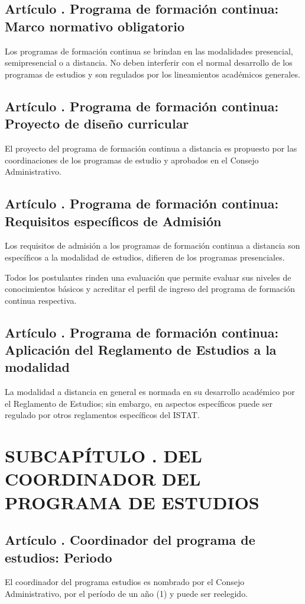 \subsection{Artículo . Programa de formación continua: Marco normativo obligatorio}
\addtocounter{ns}{1}
Los programas de formación continua se brindan en las modalidades presencial, semipresencial o a distancia. No deben interferir con el normal desarrollo de los programas de estudios y son regulados por los lineamientos académicos generales. 
\subsection{Artículo . Programa de formación continua: Proyecto de diseño curricular}
\addtocounter{ns}{1}
El proyecto del programa de formación continua a distancia es propuesto por las coordinaciones de los programas de estudio y aprobados en el Consejo Administrativo. 
\subsection{Artículo . Programa de formación continua: Requisitos específicos de Admisión}
\addtocounter{ns}{1}
Los requisitos de admisión a los programas de formación continua a distancia son específicos a la modalidad de estudios, difieren de los programas presenciales.  

Todos los postulantes rinden una evaluación que permite evaluar sus niveles de conocimientos básicos y acreditar el perfil de ingreso del programa de formación continua respectiva. 
\subsection{Artículo . Programa de formación continua: Aplicación del Reglamento de Estudios a la modalidad}
\addtocounter{ns}{1}
La modalidad a distancia en general es normada en su desarrollo académico por el Reglamento de Estudios; sin embargo, en aspectos específicos puede ser regulado por otros reglamentos específicos del ISTAT. 
\section{SUBCAPÍTULO . DEL COORDINADOR DEL PROGRAMA DE ESTUDIOS}
\addtocounter{su}{1}
\subsection{Artículo . Coordinador del programa de estudios: Periodo }
\addtocounter{ns}{1}
El coordinador del programa estudios es nombrado por el Consejo Administrativo, por el período de un año (1) y puede ser reelegido.
